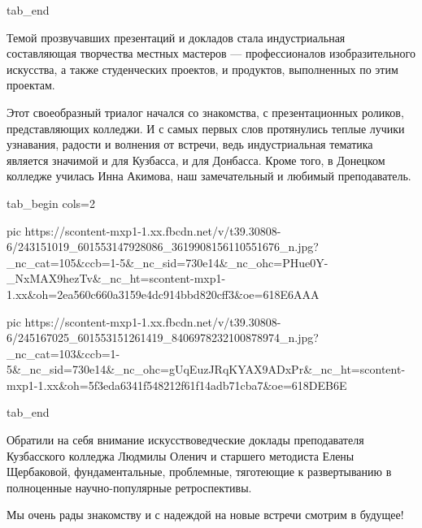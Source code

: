   tab_end
\fi

Темой прозвучавших презентаций и докладов стала индустриальная составляющая
творчества местных мастеров — профессионалов изобразительного искусства, а
также студенческих проектов, и продуктов, выполненных по этим проектам.

Этот своеобразный триалог начался со знакомства, с презентационных роликов,
представляющих колледжи. И с самых первых слов протянулись теплые лучики
узнавания, радости и волнения от встречи, ведь индустриальная тематика является
значимой и для Кузбасса, и для Донбасса. Кроме того, в Донецком колледже
училась Инна Акимова, наш замечательный и любимый преподаватель.

\ifcmt
  tab_begin cols=2

     pic https://scontent-mxp1-1.xx.fbcdn.net/v/t39.30808-6/243151019_601553147928086_3619908156110551676_n.jpg?_nc_cat=105&ccb=1-5&_nc_sid=730e14&_nc_ohc=PHue0Y-_NxMAX9hezTv&_nc_ht=scontent-mxp1-1.xx&oh=2ea560c660a3159e4dc914bbd820cff3&oe=618E6AAA

     pic https://scontent-mxp1-1.xx.fbcdn.net/v/t39.30808-6/245167025_601553151261419_8406978232100878974_n.jpg?_nc_cat=103&ccb=1-5&_nc_sid=730e14&_nc_ohc=gUqEuzJRqKYAX9ADxPr&_nc_ht=scontent-mxp1-1.xx&oh=5f3eda6341f548212f61f14adb71cba7&oe=618DEB6E

  tab_end
\fi

Обратили на себя внимание искусствоведческие доклады преподавателя Кузбасского
колледжа Людмилы Оленич и старшего методиста Елены Щербаковой, фундаментальные,
проблемные, тяготеющие к развертыванию в полноценные научно-популярные
ретроспективы.

Мы очень рады знакомству и с надеждой на новые встречи смотрим в будущее!
